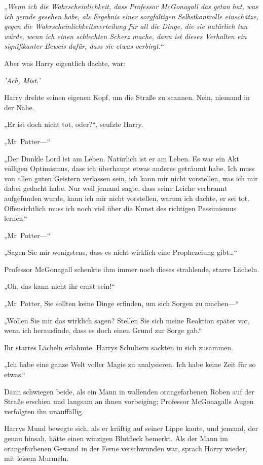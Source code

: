 {„\emph{Wenn ich die Wahrscheinlichkeit, dass Professor McGonagall das getan hat, was ich gerade gesehen habe, als Ergebnis einer sorgfältigen Selbstkontrolle einschätze, gegen die Wahrscheinlichkeitsverteilung für all die Dinge, die sie natürlich tun würde, wenn ich einen schlechten Scherz mache, dann ist dieses Verhalten ein signifikanter Beweis dafür, dass sie etwas verbirgt.}“

Aber was Harry eigentlich dachte, war:

\emph{'Ach, Mist.'}

Harry drehte seinen eigenen Kopf, um die Straße zu scannen. Nein, niemand in der Nähe.

„Er ist doch nicht tot, oder?“, seufzte Harry.

„Mr~Potter—“

„Der Dunkle Lord ist am Leben. Natürlich ist er am Leben. Es war ein Akt völligen Optimismus, dass ich überhaupt etwas anderes geträumt habe. Ich muss von allen guten Geistern verlassen sein, ich kann mir nicht vorstellen, was ich mir dabei gedacht habe. Nur weil jemand sagte, dass seine Leiche verbrannt aufgefunden wurde, kann ich mir nicht vorstellen, warum ich dachte, er sei tot. Offensichtlich muss ich noch viel über die Kunst des richtigen Pessimismus lernen.“

„Mr~Potter—“

„Sagen Sie mir wenigstens, dass es nicht wirklich eine Prophezeiung gibt…“

Professor McGonagall schenkte ihm immer noch dieses strahlende, starre Lächeln.

„Oh, das kann nicht ihr ernst sein!“

„Mr~Potter, Sie sollten keine Dinge erfinden, um sich Sorgen zu machen—“

„Wollen Sie mir das wirklich sagen? Stellen Sie sich meine Reaktion später vor, wenn ich herausfinde, dass es doch einen Grund zur Sorge gab.“

Ihr starres Lächeln erlahmte. Harrys Schultern sackten in sich zusammen.

„Ich habe eine ganze Welt voller Magie zu analysieren. Ich habe keine Zeit für so etwas.“

Dann schwiegen beide, als ein Mann in wallenden orangefarbenen Roben auf der Straße erschien und langsam an ihnen vorbeiging; Professor McGonagalls Augen verfolgten ihn unauffällig.

Harrys Mund bewegte sich, als er kräftig auf seiner Lippe kaute, und jemand, der genau hinsah, hätte einen winzigen Blutfleck bemerkt. Als der Mann im orangefarbenen Gewand in der Ferne verschwunden war, sprach Harry wieder, mit leisem Murmeln.

}
